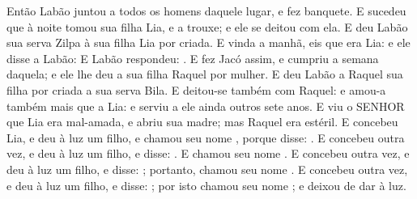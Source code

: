 {{  Então Labão juntou a todos os homens daquele lugar, e fez banquete.
  E sucedeu que à noite tomou sua filha Lia, e a trouxe; e ele se deitou com ela.
  E deu Labão sua serva Zilpa à sua filha Lia por criada.
  E vinda a manhã, eis que era Lia: e ele disse a Labão: 
  E Labão respondeu: .
  E fez Jacó assim, e cumpriu a semana daquela; e ele lhe deu a sua filha Raquel por mulher.
  E deu Labão a Raquel sua filha por criada a sua serva Bila.
  E deitou-se também com Raquel: e amou-a também mais que a Lia: e serviu a ele ainda outros sete anos.
  E viu o SENHOR que Lia era mal-amada, e abriu sua madre; mas Raquel era estéril.
  E concebeu Lia, e deu à luz um filho, e chamou seu nome , porque disse: .
  E concebeu outra vez, e deu à luz um filho, e disse: . E chamou seu nome .
  E concebeu outra vez, e deu à luz um filho, e disse: ; portanto, chamou seu nome .
  E concebeu outra vez, e deu à luz um filho, e disse: ; por isto chamou seu nome ; e deixou de dar à luz.
\par }

}

